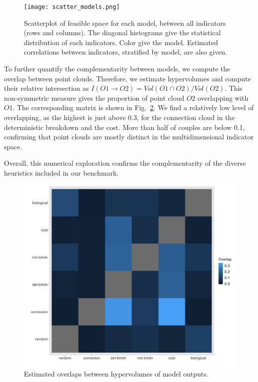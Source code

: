 \documentclass{article}
\begin{document}
\begin{figure}
\centering
\texttt{[image: scatter\_models.png]}
\caption{Scatterplot of feasible space for each model, between all indicators (rows and columns). The diagonal histograms give the statistical distribution of each indicators. Color give the model. Estimated correlations between indicators, stratified by model, are also given.\label{fig:scatter}}
\end{figure}


To further quantify the complementarity between models, we compute the overlap between point clouds. Therefore, we estimate hypervolumes and compute their relative intersection as $I(O1 \rightarrow O2) = Vol(O1 \cap O2) / Vol(O2)$. This non-symmetric measure gives the proportion of point cloud $O2$ overlapping with $O1$. The corresponding matrix is shown in Fig.~\ref{fig:overlap}. We find a relatively low level of overlapping, as the highest is just above 0.3, for the connection cloud in the deterministic breakdown and the cost. More than half of couples are below 0.1, confirming that point clouds are mostly distinct in the multidimensional indicator space.

Overall, this numerical exploration confirms the complementarity of the diverse heuristics included in our benchmark.


\begin{figure}
\centering
\includegraphics[width=\linewidth]{pointclouds-overlap.png}
\caption{Estimated overlaps between hypervolumes of model outputs.\label{fig:overlap}}
\end{figure}
\end{document}
